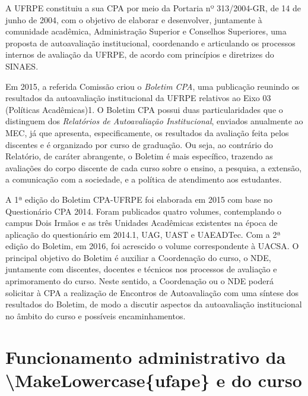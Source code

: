 \documentclass[
	12pt,				%
	openright,			%
  oneside,     %
	a4paper,			%
 hyphens,
	chapter=TITLE,		%
	english,			%
	french,				%
	spanish,			%
	brazil				%
	]{abntex2}
\begin{document}
A UFRPE constituiu a sua CPA por meio da Portaria nº 313/2004-GR, de 14 de junho de 2004, com o objetivo de elaborar e desenvolver, juntamente à comunidade acadêmica, Administração Superior e Conselhos Superiores, uma proposta de autoavaliação institucional, coordenando e articulando os processos internos de avaliação da UFRPE, de acordo com princípios e diretrizes do SINAES.

Em 2015, a referida Comissão criou o \textit{Boletim CPA}, uma publicação reunindo os resultados da autoavaliação institucional da UFRPE relativos ao Eixo 03 (Políticas Acadêmicas)1. O Boletim CPA possui duas particularidades que o distinguem dos \textit{Relatórios de Autoavaliação Institucional}, enviados anualmente ao MEC, já que apresenta, especificamente, os resultados da avaliação feita pelos discentes e é organizado por curso de graduação. Ou seja, ao contrário do Relatório, de caráter abrangente, o Boletim é mais específico, trazendo as avaliações do corpo discente de cada curso sobre o ensino, a pesquisa, a extensão, a comunicação com a sociedade, e a política de atendimento aos estudantes.

A 1ª edição do Boletim CPA-UFRPE foi elaborada em 2015 com base no Questionário CPA 2014. Foram publicados quatro volumes, contemplando o campus Dois Irmãos e as três Unidades Acadêmicas existentes na época de aplicação do questionário em 2014.1, UAG, UAST e UAEADTec. Com a 2ª edição do Boletim, em 2016, foi acrescido o volume correspondente à UACSA. O principal objetivo do Boletim é auxiliar a Coordenação do curso, o NDE, juntamente com discentes, docentes e técnicos nos processos de avaliação e aprimoramento do curso. Neste sentido, a Coordenação ou o NDE poderá solicitar à CPA a realização de Encontros de Autoavaliação com uma síntese dos resultados do Boletim, de modo a discutir aspectos da autoavaliação institucional no âmbito do curso e possíveis encaminhamentos.




%
%



\chapter{Funcionamento administrativo da \acrshort{\MakeLowercase{ufape}} e do curso}
	
\end{document}
